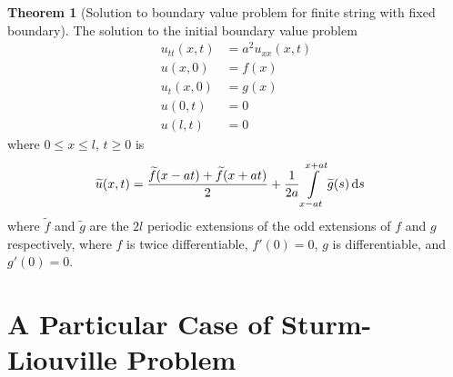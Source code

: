 \documentclass[titlepage, fleqn, a4paper, 12pt, twoside]{article}
\theoremstyle{definition}
\theoremstyle{theorem}
\newtheorem{theorem}{Theorem}
\renewcommand{\tilde}{\widetilde}
\begin{document}
\begin{theorem}[Solution to boundary value problem for finite string with fixed boundary]
	The solution to the initial boundary value problem
	\begin{align*}
		u_{t t}(x,t) & = a^2 u_{x x}(x,t) \\
		u(x,0)       & = f(x)             \\
		u_t(x,0)     & = g(x)             \\
		u(0,t)       & = 0                \\
		u(l,t)       & = 0
	\end{align*}
	where $0 \le x \le l$, $t \ge 0$ is
	\begin{align*}
		\tilde{u}(x,t) & = \frac{\tilde{f}(x - a t) + \tilde{f}(x + a t)}{2} + \frac{1}{2 a} \int\limits_{x - a t}^{x + a t} \tilde{g}(s) \dif s
	\end{align*}
	where $\tilde{f}$ and $\tilde{g}$ are the $2 l$ periodic extensions of the odd extensions of $f$ and $g$ respectively, where $f$ is twice differentiable, $f'(0) = 0$, $g$ is differentiable, and $g'(0) = 0$.
	\label{thm:Solution_to_initial_boundary_value_problem_for_finite_string_with_free_boundary}
\end{theorem}

\section{A Particular Case of Sturm-Liouville Problem}
\end{document}
